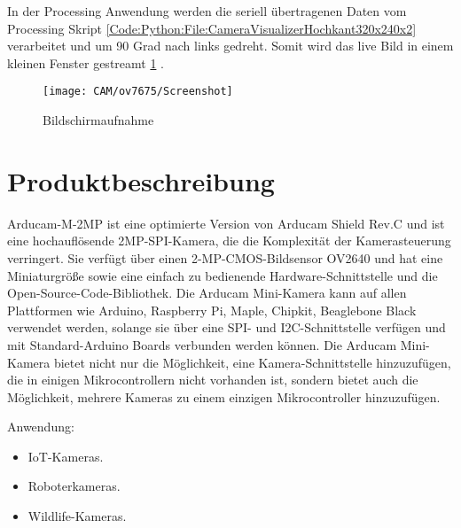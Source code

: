 In der Processing Anwendung werden die seriell übertragenen Daten vom Processing Skript \ref{Code:Python:File:CameraVisualizerHochkant320x240x2} verarbeitet und um 90 Grad nach links gedreht. Somit wird das live Bild in einem kleinen Fenster gestreamt \ref{fig:Bildschirmaufnahme} .

\begin{figure}
    \centering
    \texttt{[image: CAM/ov7675/Screenshot]}
    \caption{Bildschirmaufnahme}
    \label{fig:Bildschirmaufnahme}
\end{figure}

\begin{code}
    
    \caption[Sketch ]{Der Sketch  in Arduino für das Microcontroller Board}
    \label{Code:Python:File:CameraVisualizerHochkant320x240x2}   
\end{code}



\section{Produktbeschreibung}

Arducam-M-2MP ist eine optimierte Version von Arducam Shield Rev.C und ist eine hochauflösende 2MP-SPI-Kamera, die die Komplexität der Kamerasteuerung verringert. Sie verfügt über einen 2-MP-CMOS-Bildsensor OV2640 und hat eine Miniaturgröße sowie eine einfach zu bedienende Hardware-Schnittstelle und die Open-Source-Code-Bibliothek. Die Arducam Mini-Kamera kann auf allen Plattformen wie Arduino, Raspberry Pi, Maple, Chipkit, Beaglebone Black verwendet werden, solange sie über eine SPI- und I2C-Schnittstelle verfügen und mit Standard-Arduino Boards verbunden werden können. Die Arducam Mini-Kamera bietet nicht nur die Möglichkeit, eine Kamera-Schnittstelle hinzuzufügen, die in einigen Mikrocontrollern nicht vorhanden ist, sondern bietet auch die Möglichkeit, mehrere Kameras zu einem einzigen Mikrocontroller hinzuzufügen.
\bigskip

Anwendung:

\begin{itemize}
  \item IoT-Kameras.
  \item Roboterkameras.
  \item Wildlife-Kameras.
\end{itemize}

